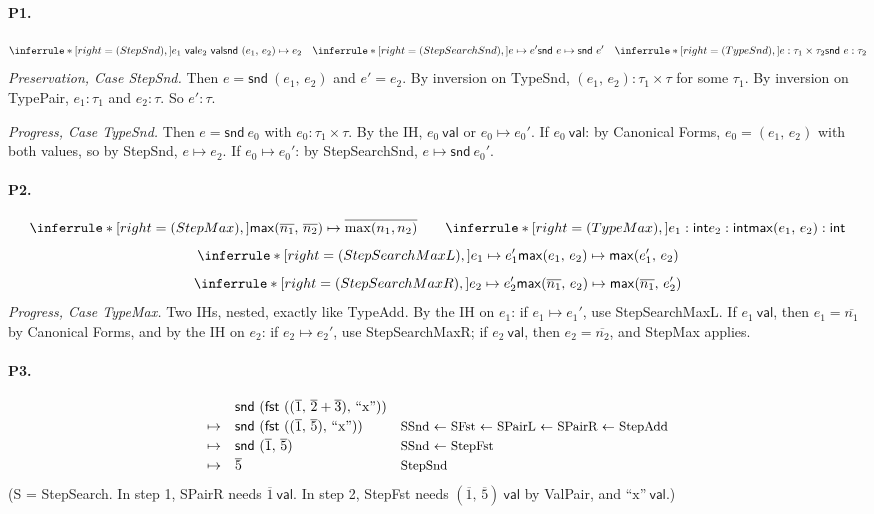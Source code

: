 \documentclass[11pt]{article}
\newcommand{\val}[1]{#1\ \mathsf{val}}
\newcommand{\stepto}[2]{#1 \mapsto #2}
\newcommand{\PAIR}[2]{(#1,\, #2)}
\newcommand{\FST}[1]{\mathsf{fst}\ #1}
\newcommand{\INT}{\mathsf{int}}
\newcommand{\num}[1]{\overline{#1}}
\newcommand{\str}[1]{\text{``#1''}}
\newcommand{\SND}[1]{\mathsf{snd}\ #1}
\newcommand{\MAX}[2]{\mathsf{max}(#1,\, #2)}
\begin{document}
\paragraph{P1.}
\[
  \Rule{StepSnd}{\val{e_1} \\ \val{e_2}}{\stepto{\SND{\PAIR{e_1}{e_2}}}{e_2}}
  \quad
  \Rule{StepSearchSnd}{\stepto{e}{e'}}{\stepto{\SND{e}}{\SND{e'}}}
  \quad
  \Rule{TypeSnd}{e:\tau_1\times\tau_2}{\SND{e}:\tau_2}
\]
\emph{Preservation, Case StepSnd.} Then $e=\SND{\PAIR{e_1}{e_2}}$ and
$e'=e_2$. By inversion on TypeSnd, $\PAIR{e_1}{e_2}:\tau_1\times\tau$ for some
$\tau_1$. By inversion on TypePair, $e_1:\tau_1$ and $e_2:\tau$. So
$e':\tau$.

\emph{Progress, Case TypeSnd.} Then $e=\SND{e_0}$ with
$e_0:\tau_1\times\tau$. By the IH, $\val{e_0}$ or $\stepto{e_0}{e_0'}$. If
$\val{e_0}$: by Canonical Forms, $e_0=\PAIR{e_1}{e_2}$ with both values, so
by StepSnd, $\stepto{e}{e_2}$. If $\stepto{e_0}{e_0'}$: by StepSearchSnd,
$\stepto{e}{\SND{e_0'}}$.

\paragraph{P2.}
\[
  \Rule{StepMax}{\strut}{\stepto{\MAX{\num{n_1}}{\num{n_2}}}{\num{\max(n_1,n_2)}}}
  \qquad
  \Rule{TypeMax}{e_1:\INT \\ e_2:\INT}{\MAX{e_1}{e_2}:\INT}
\]
\[
  \Rule{StepSearchMaxL}{\stepto{e_1}{e_1'}}{\stepto{\MAX{e_1}{e_2}}{\MAX{e_1'}{e_2}}}
\]
\[
  \Rule{StepSearchMaxR}{\stepto{e_2}{e_2'}}{\stepto{\MAX{\num{n_1}}{e_2}}{\MAX{\num{n_1}}{e_2'}}}
\]
\emph{Progress, Case TypeMax.} Two IHs, nested, exactly like TypeAdd. By the
IH on $e_1$: if $\stepto{e_1}{e_1'}$, use StepSearchMaxL. If $\val{e_1}$,
then $e_1=\num{n_1}$ by Canonical Forms, and by the IH on $e_2$: if
$\stepto{e_2}{e_2'}$, use StepSearchMaxR; if $\val{e_2}$, then
$e_2=\num{n_2}$, and StepMax applies.

\paragraph{P3.}
\[
\begin{array}{r l l}
  & \SND{(\FST{\PAIR{\PAIR{\num1}{\num2+\num3}}{\str{x}}})} & \\[2pt]
  \mapsto & \SND{(\FST{\PAIR{\PAIR{\num1}{\num5}}{\str{x}}})}
    & \text{\small SSnd $\leftarrow$ SFst $\leftarrow$ SPairL $\leftarrow$ SPairR $\leftarrow$ StepAdd}\\[2pt]
  \mapsto & \SND{\PAIR{\num1}{\num5}}
    & \text{\small SSnd $\leftarrow$ StepFst}\\[2pt]
  \mapsto & \num5 & \text{\small StepSnd}
\end{array}
\]
(S = StepSearch. In step 1, SPairR needs $\val{\num1}$. In step 2, StepFst
needs $\val{\PAIR{\num1}{\num5}}$ by ValPair, and $\val{\str{x}}$.)
\end{document}
